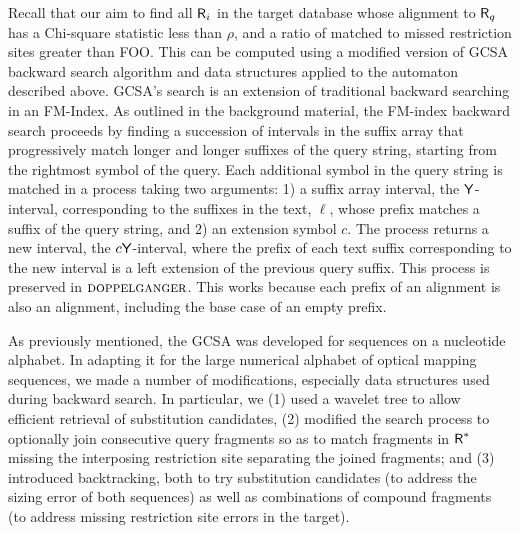 Recall that our aim to find all $\mbox{\rm {\sf R}}_i$ in the target database whose alignment to $\mbox{\rm {\sf R}}_q$ has a Chi-square statistic less than $\rho$, and a ratio of matched to missed restriction sites greater than FOO. This can be computed using a modified version of GCSA backward search algorithm and data structures applied to the automaton described above.  GCSA's search is an extension of traditional backward searching in an FM-Index.  As outlined in the background material, the FM-index backward search proceeds by finding a succession of intervals in the suffix array that progressively match longer and longer suffixes of the query string, starting from the rightmost symbol of the query.   Each additional symbol in the query string is matched in a process taking two arguments: 1) a suffix array interval, the $\mathsf{Y}$-interval, corresponding to the suffixes in the text, $\ell$, whose prefix matches a suffix of the query string, and 2) an extension symbol $c$.  The process returns a new interval, the $c\mathsf{Y}$-interval, where the prefix of each text suffix corresponding to the new interval is a left extension of the previous query suffix. This process is preserved in $\mbox{\rm {\sc doppelganger}}$. This works because each prefix of an alignment is also an alignment, including the base case of an empty prefix.

As previously mentioned, the GCSA was developed for sequences on a nucleotide alphabet. In adapting it for the large numerical alphabet of optical mapping sequences, we made a number of modifications, especially data structures used during backward search.  In particular, we (1) used a wavelet tree to allow efficient retrieval of substitution candidates, (2) modified the search process to optionally join consecutive query fragments so as to match fragments in $\mbox{\rm {\sf R}}^*$ missing the interposing restriction site separating the joined fragments; and 
(3) introduced backtracking, both to try substitution candidates (to address the sizing error of both sequences) as well as combinations of compound fragments (to address missing restriction site errors in the target).

